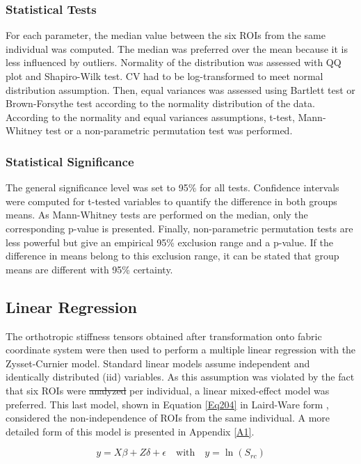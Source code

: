 \documentclass[a4paper,fleqn]{DC_ArtStyle}
\providecommand{\DIFadd}[1]{{\protect\color{blue}{#1}}} %
\providecommand{\DIFdel}[1]{{\protect\color{red}\sout{#1}}}                      %
\providecommand{\DIFaddbegin}{} %
\providecommand{\DIFaddend}{} %
\providecommand{\DIFdelbegin}{} %
\providecommand{\DIFdelend}{} %
\begin{document}
\subsubsection{Statistical Tests}
For each parameter, the median value between the six ROIs from the same individual was computed. The median was preferred over the mean because it is less influenced by outliers. Normality of the distribution was assessed with QQ plot and Shapiro-Wilk test. CV had to be log-transformed to meet normal distribution assumption. Then, equal variances was assessed using Bartlett test or Brown-Forsythe test according to the normality distribution of the data. According to the normality and equal variances assumptions, t-test, Mann-Whitney test or a non-parametric permutation test was performed. 

\subsubsection{Statistical Significance}
The general significance level was set to 95\% for all tests. Confidence intervals were computed for t-tested variables to quantify the difference in both groups means. As Mann-Whitney tests are performed on the median, only the corresponding p-value is presented. Finally, non-parametric permutation tests are less powerful but give an empirical 95\% exclusion range and a p-value. If the difference in means belong to this exclusion range, it can be stated that group means are different with 95\% certainty.

\subsection{Linear Regression}
The orthotropic stiffness tensors obtained after transformation onto fabric coordinate system were then used to perform a multiple linear regression with the Zysset-Curnier model. Standard linear models assume independent and identically distributed (iid) variables. As this assumption was violated by the fact that six ROIs were \DIFdelbegin \DIFdel{analyzed }\DIFdelend \DIFaddbegin \DIFadd{analysed }\DIFaddend per individual, a linear mixed-effect model was preferred. This last model, shown in Equation \ref{Eq204} in Laird-Ware form \cite{Laird1982}, considered the non-independence of ROIs from the same individual. A more detailed form of this model is presented in Appendix \ref{A1}.

\begin{equation}
	y = X \beta + Z \delta + \epsilon \quad \text{with} \quad y = \ln(S_{rc})
	\label{Eq204}
\end{equation}
\end{document}
